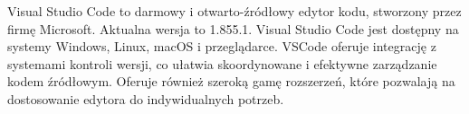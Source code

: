 Visual Studio Code to darmowy i otwarto-źródłowy  edytor kodu, stworzony przez firmę Microsoft. Aktualna wersja to 1.855.1. Visual Studio Code jest dostępny na systemy Windows, Linux, macOS i przeglądarce. VSCode oferuje integrację z systemami kontroli wersji, co ułatwia skoordynowane i efektywne zarządzanie kodem źródłowym. Oferuje również szeroką gamę rozszerzeń, które pozwalają na dostosowanie edytora do indywidualnych potrzeb. \autocite{vscode}